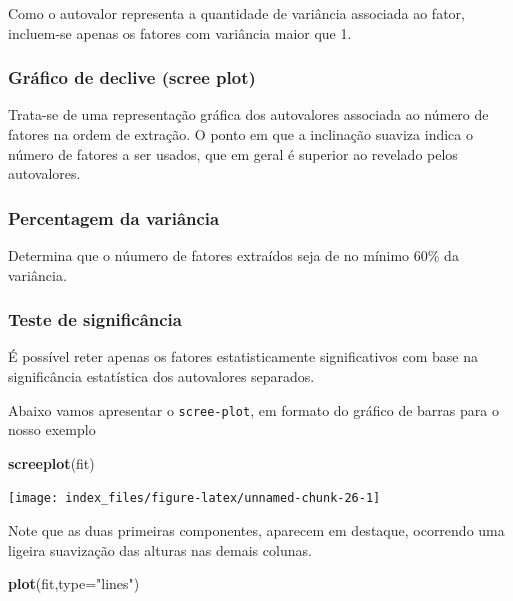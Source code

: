 \documentclass[12pt,brazil,oneside]{book}
\newenvironment{Shaded}{\begin{snugshade}}{\end{snugshade}}
\newcommand{\DataTypeTok}[1]{\textcolor[rgb]{0.13,0.29,0.53}{#1}}
\newcommand{\KeywordTok}[1]{\textcolor[rgb]{0.13,0.29,0.53}{\textbf{#1}}}
\newcommand{\NormalTok}[1]{#1}
\newcommand{\StringTok}[1]{\textcolor[rgb]{0.31,0.60,0.02}{#1}}
\begin{document}
Como o autovalor representa a quantidade de variância associada ao
fator, incluem-se apenas os fatores com variância maior que 1.

\hypertarget{grafico-de-declive-scree-plot}{%
\subsubsection{\texorpdfstring{Gráfico de declive (\textbf{scree
plot})}{Gráfico de declive (scree plot)}}\label{grafico-de-declive-scree-plot}}

Trata-se de uma representação gráfica dos autovalores associada ao
número de fatores na ordem de extração. O ponto em que a inclinação
suaviza indica o número de fatores a ser usados, que em geral é superior
ao revelado pelos autovalores.

\hypertarget{percentagem-da-variancia}{%
\subsubsection{Percentagem da
variância}\label{percentagem-da-variancia}}

Determina que o núumero de fatores extraídos seja de no mínimo 60\% da
variância.

\hypertarget{teste-de-significancia}{%
\subsubsection{Teste de significância}\label{teste-de-significancia}}

É possível reter apenas os fatores estatisticamente significativos com
base na significância estatística dos autovalores separados.

Abaixo vamos apresentar o \texttt{scree-plot}, em formato do gráfico de
barras para o nosso exemplo

\begin{Shaded}
\begin{Highlighting}[]
\KeywordTok{screeplot}\NormalTok{(fit)}
\end{Highlighting}
\end{Shaded}

\begin{center}\texttt{[image: index\_files/figure-latex/unnamed-chunk-26-1]} \end{center}

Note que as duas primeiras componentes, aparecem em destaque, ocorrendo
uma ligeira suavização das alturas nas demais colunas.

\begin{Shaded}
\begin{Highlighting}[]
\KeywordTok{plot}\NormalTok{(fit,}\DataTypeTok{type=}\StringTok{"lines"}\NormalTok{)}
\end{Highlighting}
\end{Shaded}
\end{document}
